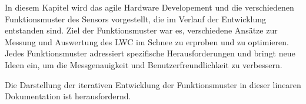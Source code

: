
In diesem Kapitel wird das agile Hardware Developement und die verschiedenen Funktionsmuster des Sensors vorgestellt, die im Verlauf der Entwicklung entstanden sind. Ziel der Funktionsmuster war es, verschiedene Ansätze zur Messung und Auswertung des LWC im Schnee zu erproben und zu optimieren. Jedes Funktionsmuster adressiert spezifische Herausforderungen und bringt neue Ideen ein, um die Messgenauigkeit und Benutzerfreundlichkeit zu verbessern.

Die Darstellung der iterativen Entwicklung der Funktionsmuster in dieser linearen Dokumentation ist herausfordernd.
